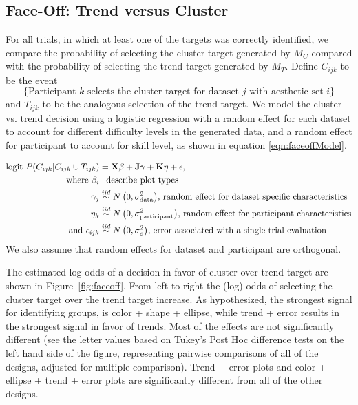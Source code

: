 \documentclass[12pt]{article}\usepackage[]{graphicx}\usepackage[]{color}
\begin{document}
\subsection{Face-Off: Trend versus Cluster}\label{sec:faceoff}

 For all trials, in which at least one of the targets was correctly identified, we compare the probability of selecting the cluster target generated by $M_C$ compared with the probability of selecting the trend target generated by $M_T$. 
Define $C_{ijk}$ to be the event $$\{\text{Participant }k\text{ selects the cluster target for dataset }j\text{ with aesthetic set }i\}$$
and $T_{ijk}$ to be the analogous selection of the trend target.
We model the cluster vs. trend decision using a logistic regression with a random effect for each dataset to account for different difficulty levels in the generated data, and a random effect for participant to account for skill level, as shown in equation \ref{eqn:faceoffModel}. 


\begin{align}
\text{logit }P(C_{ijk} | C_{ijk}\cup T_{ijk}) & =  \textbf{X}\beta + \textbf{J}\gamma + \textbf{K}\eta + \epsilon, \label{eqn:faceoffModel}\\
\text{where } \beta_i & \hphantom{\sim} \text{describe plot types}\nonumber\\
\hphantom{where } \gamma_j & \overset{iid}{\sim} N\left(0, \sigma^2_{\text{data}}\right)\!\text{,  random effect for dataset specific characteristics}\nonumber\\
\hphantom{where } \eta_k & \overset{iid}{\sim} N\left(0, \sigma^2_{\text{participant}}\right)\!\text{, random effect for participant characteristics}\nonumber\\
\text{and } \epsilon_{ijk} & \overset{iid}{\sim}  N\left(0, \sigma^2_e\right)\!\text{, error associated with a single trial evaluation} \nonumber\end{align}
We also assume that random effects for dataset and participant are orthogonal. 

The estimated log odds of a decision in favor of cluster over trend target are shown in Figure~\ref{fig:faceoff}. From left to right the (log) odds of selecting the cluster target over the trend target increase. As hypothesized, the strongest signal for identifying groups, is color + shape + ellipse, while trend + error results in the strongest signal in favor of trends. Most of the effects are not significantly different (see the letter values \cite{piepho:04} based on Tukey's Post Hoc difference tests on the left hand side of the figure, representing pairwise comparisons of all of the designs, adjusted for multiple comparison). Trend + error plots and color + ellipse + trend + error plots are significantly different from all of the other designs. 
\end{document}
